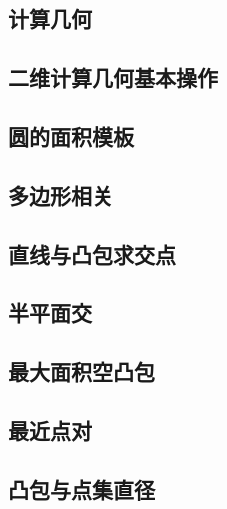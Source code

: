 \documentclass[landscape, twocolumn, 8pt, a4paper, twoside]{extarticle}
\begin{document}
\begin{spacing}{0.1}%
\section{计算几何}
  \subsection{二维计算几何基本操作}
  

  \subsection{圆的面积模板}
  

  \subsection{多边形相关}
  

  \subsection{直线与凸包求交点}
  

  \subsection{半平面交}
  

  \subsection{最大面积空凸包}
  

  \subsection{最近点对}
  

  \subsection{凸包与点集直径}
  


\end{spacing}
\end{document}
